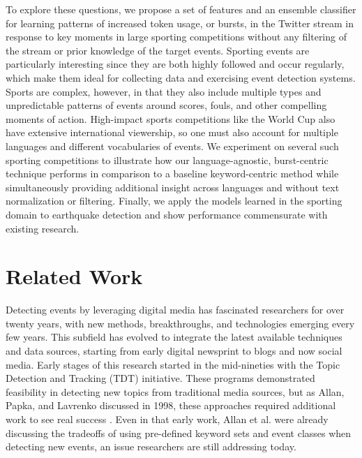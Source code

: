 \documentclass{sig-alternate}
\begin{document}
To explore these questions, we propose a set of features and an ensemble classifier for learning patterns of increased token usage, or bursts, in the Twitter stream in response to key moments in large sporting competitions without any filtering of the stream or prior knowledge of the target events.
Sporting events are particularly interesting since they are both highly followed and occur regularly, which make them ideal for collecting data and exercising event detection systems.
Sports are complex, however, in that they also include multiple types and unpredictable patterns of events around scores, fouls, and other compelling moments of action.
High-impact sports competitions like the World Cup also have extensive international viewership, so one must also account for multiple languages and different vocabularies of events.
We experiment on several such sporting competitions to illustrate how our language-agnostic, burst-centric technique performs in comparison to a baseline keyword-centric method while simultaneously providing additional insight across languages and without text normalization or filtering.
Finally, we apply the models learned in the sporting domain to earthquake detection and show performance commensurate with existing research.


\section{Related Work}
\label{sect:relatedWork}

Detecting events by leveraging digital media has fascinated researchers for over twenty years, with new methods, breakthroughs, and technologies emerging every few years.
This subfield has evolved to integrate the latest available techniques and data sources, starting from early digital newsprint to blogs and now social media.
Early stages of this research started in the mid-nineties with the Topic Detection and Tracking (TDT) initiative.
These programs demonstrated feasibility in detecting new topics from traditional media sources, but as Allan, Papka, and Lavrenko discussed in 1998, these approaches required additional work to see real success \cite{allan1998line}.
Even in that early work, Allan et al. were already discussing the tradeoffs of using pre-defined keyword sets and event classes when detecting new events, an issue researchers are still addressing today.
\end{document}

